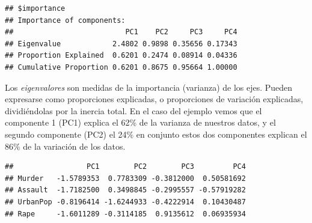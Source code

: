 \documentclass[]{book}
\newenvironment{Shaded}{\begin{snugshade}}{\end{snugshade}}
\newcommand{\KeywordTok}[1]{\textcolor[rgb]{0.13,0.29,0.53}{\textbf{{#1}}}}
\newcommand{\DataTypeTok}[1]{\textcolor[rgb]{0.13,0.29,0.53}{{#1}}}
\newcommand{\StringTok}[1]{\textcolor[rgb]{0.31,0.60,0.02}{{#1}}}
\newcommand{\CommentTok}[1]{\textcolor[rgb]{0.56,0.35,0.01}{\textit{{#1}}}}
\newcommand{\OtherTok}[1]{\textcolor[rgb]{0.56,0.35,0.01}{{#1}}}
\newcommand{\NormalTok}[1]{{#1}}
\begin{document}
\begin{Shaded}
\end{Shaded}

\begin{verbatim}
## $importance
## Importance of components:
##                          PC1    PC2     PC3     PC4
## Eigenvalue            2.4802 0.9898 0.35656 0.17343
## Proportion Explained  0.6201 0.2474 0.08914 0.04336
## Cumulative Proportion 0.6201 0.8675 0.95664 1.00000
\end{verbatim}

Los \emph{eigenvalores} son medidas de la importancia (varianza) de los
ejes. Pueden expresarse como proporciones explicadas, o proporciones de
variación explicadas, dividiéndolas por la inercia total. En el caso del
ejemplo vemos que el componente 1 (PC1) explica el 62\% de la varianza
de nuestros datos, y el segundo componente (PC2) el 24\% en conjunto
estos dos componentes explican el 86\% de la variación de los datos.

\begin{Shaded}
\end{Shaded}

\begin{verbatim}
##                 PC1        PC2        PC3         PC4
## Murder   -1.5789353  0.7783309 -0.3812000  0.50581692
## Assault  -1.7182500  0.3498845 -0.2995557 -0.57919282
## UrbanPop -0.8196414 -1.6244933 -0.4222914  0.10430487
## Rape     -1.6011289 -0.3114185  0.9135612  0.06935934
\end{verbatim}
\end{document}
